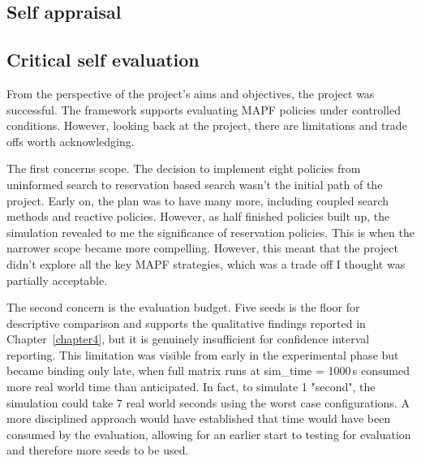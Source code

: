\begin{appendices}

%
%
\chapter{Self appraisal}

\section{Critical self evaluation}

From the perspective of the project's aims and objectives, the project was successful. The framework supports evaluating MAPF policies under controlled conditions. However, looking back at the project, there are limitations and trade offs worth acknowledging. \par

\vspace{1em}

The first concerns scope. The decision to implement eight policies from uninformed search to reservation based search wasn't the initial path of the project. Early on, the plan was to have many more, including coupled search methods and reactive policies. However, as half finished policies built up, the simulation revealed to me the significance of reservation policies. This is when the narrower scope became more compelling. However, this meant that the project didn't explore all the key MAPF strategies, which was a trade off I thought was partially acceptable. \par

\vspace{1em}

The second concern is the evaluation budget. Five seeds is the floor for descriptive comparison and supports the qualitative findings reported in Chapter~\ref{chapter4}, but it is genuinely insufficient for confidence interval reporting. This limitation was visible from early in the experimental phase but became binding only late, when full matrix runs at sim\_time = 1000\,s consumed more real world time than anticipated. In fact, to simulate 1 "second", the simulation could take 7 real world seconds using the worst case configurations. A more disciplined approach would have established that time would have been consumed by the evaluation, allowing for an earlier start to testing for evaluation and therefore more seeds to be used. \par


\end{appendices}
